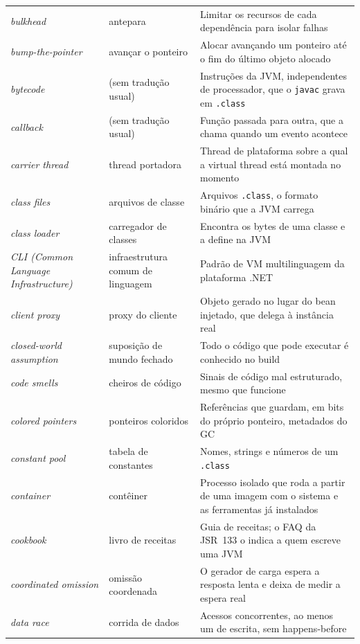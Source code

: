 \begin{longtable}{@{}>{\raggedright}p{3.9cm} >{\raggedright}p{3.6cm} >{\raggedright\arraybackslash}p{6.3cm}@{}}
\textit{bulkhead} & antepara & Limitar os recursos de cada dependência para isolar falhas \\
\textit{bump-the-pointer} & avançar o ponteiro & Alocar avançando um ponteiro até o fim do último objeto alocado \\
\textit{bytecode} & (sem tradução usual) & Instruções da JVM, independentes de processador, que o \texttt{javac} grava em \texttt{.class} \\
\textit{callback} & (sem tradução usual) & Função passada para outra, que a chama quando um evento acontece \\
\textit{carrier thread} & thread portadora & Thread de plataforma sobre a qual a virtual thread está montada no momento \\
\textit{class files} & arquivos de classe & Arquivos \texttt{.class}, o formato binário que a JVM carrega \\
\textit{class loader} & carregador de classes & Encontra os bytes de uma classe e a define na JVM \\
\textit{CLI (Common Language Infrastructure)} & infraestrutura comum de linguagem & Padrão de VM multilinguagem da plataforma .NET \\
\textit{client proxy} & proxy do cliente & Objeto gerado no lugar do bean injetado, que delega à instância real \\
\textit{closed-world assumption} & suposição de mundo fechado & Todo o código que pode executar é conhecido no build \\
\textit{code smells} & cheiros de código & Sinais de código mal estruturado, mesmo que funcione \\
\textit{colored pointers} & ponteiros coloridos & Referências que guardam, em bits do próprio ponteiro, metadados do GC \\
\textit{constant pool} & tabela de constantes & Nomes, strings e números de um \texttt{.class} \\
\textit{container} & contêiner & Processo isolado que roda a partir de uma imagem com o sistema e as ferramentas já instalados \\
\textit{cookbook} & livro de receitas & Guia de receitas; o FAQ da JSR~133 o indica a quem escreve uma JVM \\
\textit{coordinated omission} & omissão coordenada & O gerador de carga espera a resposta lenta e deixa de medir a espera real \\
\textit{data race} & corrida de dados & Acessos concorrentes, ao menos um de escrita, sem happens-before \\

\end{longtable}
